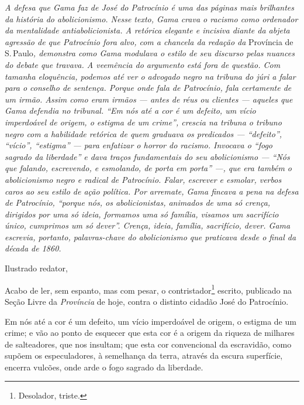 \begin{resumo}
\emph{A defesa que Gama faz de José do Patrocínio é uma das páginas mais
brilhantes da história do abolicionismo. Nesse texto, Gama crava o
racismo como ordenador da mentalidade antiabolicionista. A retórica
elegante e incisiva diante da abjeta agressão de que Patrocínio fora
alvo, com a chancela da redação da} Província de S.\,Paulo\emph{,
demonstra como Gama modulava o estilo de seu discurso pelas nuances do
debate que travava. A veemência do argumento está fora de questão. Com
tamanha eloquência, podemos até ver o advogado negro na tribuna do
júri a falar para o conselho de sentença. Porque onde fala de
Patrocínio, fala certamente de um irmão. Assim como eram irmãos --- antes
de réus ou clientes --- aqueles que Gama defendia no tribunal. ``Em nós
até a cor é um defeito, um vício imperdoável de origem, o estigma de um
crime'', crescia na tribuna o tribuno negro com a habilidade retórica de
quem graduava os predicados --- ``defeito'', ``vício'', ``estigma'' --- para
enfatizar o horror do racismo. Invocava o ``fogo sagrado da liberdade'' e
dava traços fundamentais do seu abolicionismo --- ``Nós que falando,
escrevendo, e esmolando, de porta em porta'' ---, que era também o
abolicionismo negro e radical de Patrocínio. Falar, escrever e esmolar,
verbos caros ao seu estilo de ação política. Por arremate, Gama fincava
a pena na defesa de Patrocínio, ``porque nós, os abolicionistas, animados
de uma só crença, dirigidos por uma só ideia, formamos uma só família,
visamos um sacrifício único, cumprimos um só dever''. Crença, ideia,
família, sacrifício, dever. Gama escrevia, portanto, palavras-chave do
abolicionismo que praticava desde o final da década de 1860. }
\end{resumo}

Ilustrado redator,

Acabo de ler, sem espanto, mas com pesar, o contristador\footnote{
  Desolador, triste.} escrito, publicado na Seção Livre da
\emph{Província} de hoje, contra o distinto cidadão José do Patrocínio.

Em nós até a cor é um defeito, um vício imperdoável de origem, o estigma
de um crime; e vão ao ponto de esquecer que esta cor é a origem da
riqueza de milhares de salteadores, que nos insultam; que esta cor
convencional da escravidão, como supõem os especuladores, à semelhança
da terra, através da escura superfície, encerra vulcões, onde arde o
fogo sagrado da liberdade.

